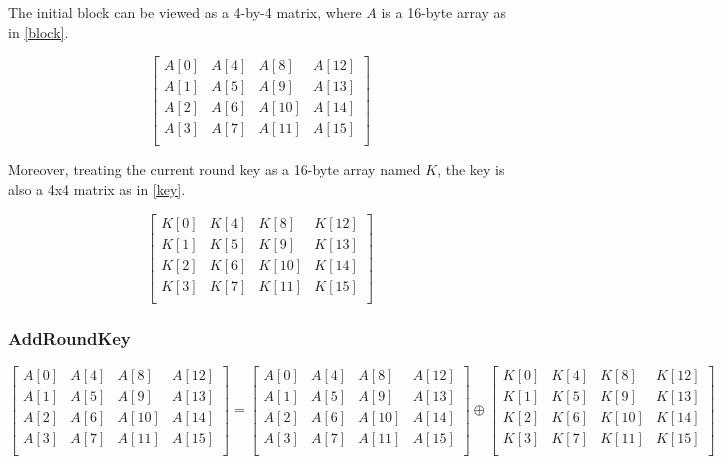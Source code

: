 \documentclass[a4paper,10pt]{article}
\begin{document}
The initial block can be viewed as a 4-by-4 matrix, where $A$ is a 16-byte array as in \eqref{block}.

\begin{equation}
 \begin{bmatrix}
  A[0] & A[4] & A[8] & A[12] \\
  A[1] & A[5] & A[9] & A[13] \\
  A[2] & A[6] & A[10] & A[14] \\
  A[3] & A[7] & A[11] & A[15] \\
 \end{bmatrix}
\label{block}
\end{equation}

Moreover, treating the current round key as a 16-byte array named $K$, the key is also a 4x4 matrix as in \eqref{key}.

\begin{equation}
 \begin{bmatrix}
  K[0] & K[4] & K[8] & K[12] \\
  K[1] & K[5] & K[9] & K[13] \\
  K[2] & K[6] & K[10] & K[14] \\
  K[3] & K[7] & K[11] & K[15] \\
 \end{bmatrix}
\label{key}
\end{equation}

\subsubsection{AddRoundKey}

\begin{equation}
 \begin{bmatrix}
  A[0] & A[4] & A[8] & A[12] \\
  A[1] & A[5] & A[9] & A[13] \\
  A[2] & A[6] & A[10] & A[14] \\
  A[3] & A[7] & A[11] & A[15] \\
 \end{bmatrix}
 =
 \begin{bmatrix}
  A[0] & A[4] & A[8] & A[12] \\
  A[1] & A[5] & A[9] & A[13] \\
  A[2] & A[6] & A[10] & A[14] \\
  A[3] & A[7] & A[11] & A[15] \\
 \end{bmatrix}
 \oplus
 \begin{bmatrix}
  K[0] & K[4] & K[8] & K[12] \\
  K[1] & K[5] & K[9] & K[13] \\
  K[2] & K[6] & K[10] & K[14] \\
  K[3] & K[7] & K[11] & K[15] \\
 \end{bmatrix}
\label{addroundkey}
\end{equation}
\end{document}
